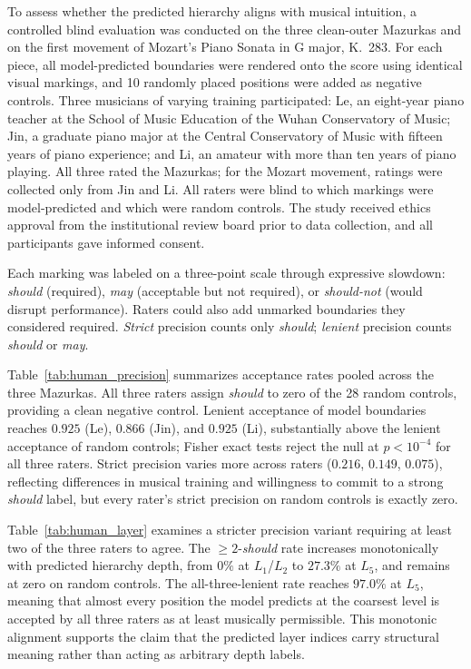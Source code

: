 \documentclass{article}
\begin{document}
To assess whether the predicted hierarchy aligns with musical intuition, a controlled blind evaluation was conducted on the three clean-outer Mazurkas and on the first movement of Mozart's Piano Sonata in G major, K.~283. For each piece, all model-predicted boundaries were rendered onto the score using identical visual markings, and 10 randomly placed positions were added as negative controls. Three musicians of varying training participated: Le, an eight-year piano teacher at the School of Music Education of the Wuhan Conservatory of Music; Jin, a graduate piano major at the Central Conservatory of Music with fifteen years of piano experience; and Li, an amateur with more than ten years of piano playing. All three rated the Mazurkas; for the Mozart movement, ratings were collected only from Jin and Li. All raters were blind to which markings were model-predicted and which were random controls. The study received ethics approval from the institutional review board prior to data collection, and all participants gave informed consent.

Each marking was labeled on a three-point scale through expressive slowdown: \emph{should} (required), \emph{may} (acceptable but not required), or \emph{should-not} (would disrupt performance). Raters could also add unmarked boundaries they considered required. \emph{Strict} precision counts only \emph{should}; \emph{lenient} precision counts \emph{should} or \emph{may}.

Table~\ref{tab:human_precision} summarizes acceptance rates pooled across the three Mazurkas. All three raters assign \emph{should} to zero of the 28 random controls, providing a clean negative control. Lenient acceptance of model boundaries reaches \(0.925\) (Le), \(0.866\) (Jin), and \(0.925\) (Li), substantially above the lenient acceptance of random controls; Fisher exact tests reject the null at \(p<10^{-4}\) for all three raters. Strict precision varies more across raters (\(0.216\), \(0.149\), \(0.075\)), reflecting differences in musical training and willingness to commit to a strong \emph{should} label, but every rater's strict precision on random controls is exactly zero.

Table~\ref{tab:human_layer} examines a stricter precision variant requiring at least two of the three raters to agree. The \(\geq 2\)-\emph{should} rate increases monotonically with predicted hierarchy depth, from $0\%$ at $L_1$/$L_2$ to $27.3\%$ at $L_5$, and remains at zero on random controls. The all-three-lenient rate reaches $97.0\%$ at $L_5$, meaning that almost every position the model predicts at the coarsest level is accepted by all three raters as at least musically permissible. This monotonic alignment supports the claim that the predicted layer indices carry structural meaning rather than acting as arbitrary depth labels.
\end{document}
